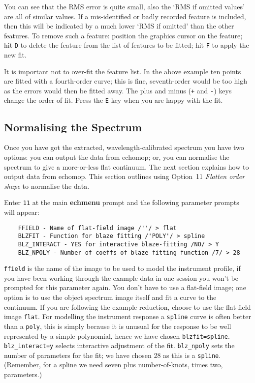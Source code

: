 \documentclass[twoside,11pt]{article}
\newcommand{\xref}[3]{#1}
\newcommand{\scspec}[2]{#1}
\newcommand{\scspec}[2]{#2}
\begin{document}
You can see that the RMS error is quite small, also the `RMS if omitted
values' are all of similar values.  If a mis-identified or badly recorded
feature is included, then this will be indicated by a much lower
`RMS if omitted' than the other features.  To remove such a feature:
position the graphics cursor on the feature; hit \verb+D+ to delete the
feature from the list of features to be fitted; hit \verb+F+ to apply the
new fit.

It is important not to over-fit the feature list.  In the above example
ten points are fitted with a fourth-order curve; this is fine,
seventh-order would be too high as the errors would then be fitted away.
The plus and minus (\verb=+= and \verb=-=) keys change the order of fit.
Press the \verb+E+ key when you are happy with the fit.


\subsection{Normalising the Spectrum}

Once you have got the extracted, wavelength-calibrated spectrum you have
two options: you can output the data from {\sc echomop}; or, you can normalise
the spectrum to give a more-or-less flat continuum.  The next section
explains how to output data from {\sc echomop}.  This section outlines using
\xref{Option~11 {\sl Flatten order shape}}{sun152}{option11} to normalise
the data.

Enter \verb+11+ at the main \xref{{\bf echmenu}}{sun152}{ECHMENU} prompt
and the following parameter prompts will appear:

{
\scspec{\small}{ }
\begin{verbatim}
    FFIELD - Name of flat-field image /''/ > flat
    BLZFIT - Function for blaze fitting /'POLY'/ > spline
    BLZ_INTERACT - YES for interactive blaze-fitting /NO/ > Y
    BLZ_NPOLY - Number of coeffs of blaze fitting function /7/ > 28
\end{verbatim}
}

\xref{{\tt{ffield}}}{sun152}{par_FFIELD} is the name of the image to be
used to model the instrument profile, if you have been working through the
example data in one session you won't be prompted for this parameter
again.
You don't have to use a flat-field image; one option is to use
the object spectrum image itself and fit a curve to the continuum.
If you are following the example reduction, choose to use the flat-field
image \verb+flat+\@.
For modelling the instrument response a \verb+spline+ curve is often
better than a \verb+poly+, this is simply because it is unusual
for the response to be well represented by a simple polynomial, hence we
have chosen \xref{{\tt{blzfit=spline}}}{sun152}{par_BLZFIT}\@.
\xref{{\tt blz\_interact=y}}{sun152}{par_BLZ_INTERACT} selects
interactive adjustment of the fit.
\xref{{\tt blz\_npoly}}{sun152}{par_BLZ_NPOLY} sets the number of
parameters for the fit; we have chosen 28 as this is a \verb+spline+\@.
(Remember, for a spline we need seven plus number-of-knots, times two,
parameters.)
\end{document}
